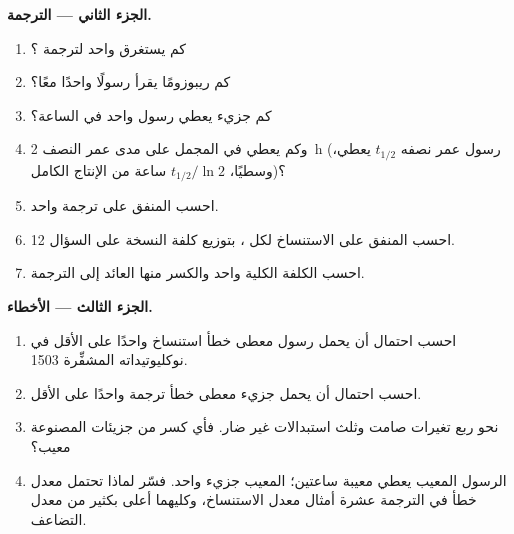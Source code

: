 \begin{problem}
\medskip
\noindent\textbf{الجزء الثاني --- الترجمة.}
\begin{enumerate}[resume]
  \item كم يستغرق  واحد لترجمة ؟
  \item كم ريبوزومًا يقرأ رسولًا واحدًا معًا؟
  \item كم جزيء  يعطي رسول واحد في الساعة؟
  \item وكم يعطي في المجمل على مدى عمر النصف \qty{2}{h} (رسول عمر
        نصفه $t_{1/2}$ يعطي، وسطيًا، $t_{1/2}/\ln 2$ ساعة من
        الإنتاج الكامل)؟
  \item احسب  المنفق على ترجمة  واحد.
  \item احسب  المنفق على الاستنساخ لكل ، بتوزيع كلفة
        النسخة على  السؤال 12.
  \item احسب الكلفة الكلية  واحد والكسر منها العائد إلى
        الترجمة.
\end{enumerate}

\medskip
\noindent\textbf{الجزء الثالث --- الأخطاء.}
\begin{enumerate}[resume]
  \item احسب احتمال أن يحمل رسول معطى خطأ استنساخ واحدًا على الأقل
        في نوكليوتيداته المشفِّرة \qty{1503}{}.
  \item احسب احتمال أن يحمل جزيء  معطى خطأ ترجمة واحدًا على
        الأقل.
  \item نحو ربع تغيرات  صامت وثلث استبدالات  غير ضار. فأي كسر من جزيئات  المصنوعة
        معيب؟
  \item الرسول المعيب يعطي  معيبة ساعتين؛  المعيب
        جزيء واحد. فسّر لماذا تحتمل  معدل خطأ في الترجمة
        عشرة أمثال معدل الاستنساخ، وكليهما أعلى بكثير من معدل
        التضاعف.
\end{enumerate}


\end{problem}
